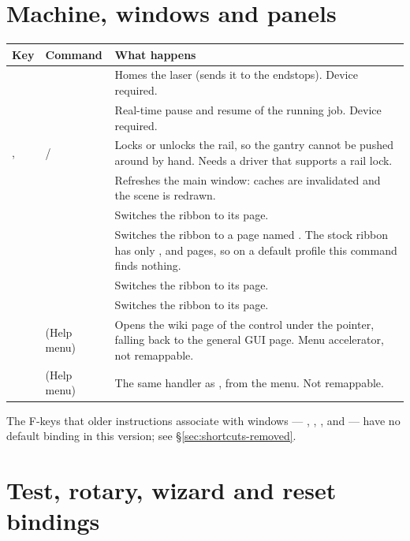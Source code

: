 \section{Machine, windows and panels}

\begin{center}\small
\begin{tabular}{@{}L{3.4cm}L{4.8cm}L{6.6cm}@{}}
\toprule
\textbf{Key} & \textbf{Command} & \textbf{What happens} \\
\midrule
{} &  & Homes the laser (sends it to the endstops). Device
required. \\
 &  & Real-time pause and resume of the running job.
Device required. \\
,  &  /  & Locks or unlocks the rail, so the
gantry cannot be pushed around by hand. Needs a driver that supports a rail
lock. \\
 &  & Refreshes the main window: caches are invalidated and
the scene is redrawn. \\
\midrule
{} &  & Switches the ribbon to its 
page. \\
 &  & Switches the ribbon to a page named
. The stock ribbon has only ,  and
 pages, so on a default profile this command finds nothing. \\
 &  & Switches the ribbon to its 
page. \\
 &  & Switches the ribbon to its 
page. \\
\midrule
{} & (Help menu) & Opens the wiki page of the control under the pointer,
falling back to the general GUI page. Menu accelerator, not remappable. \\
 & (Help menu) & The same handler as , from the 
menu. Not remappable. \\
\bottomrule
\end{tabular}
\end{center}

\noindent The F-keys that older instructions associate with windows ---
, , ,  and  --- have no default binding
in this version; see \S\ref{sec:shortcuts-removed}.

\section{Test, rotary, wizard and reset bindings}

